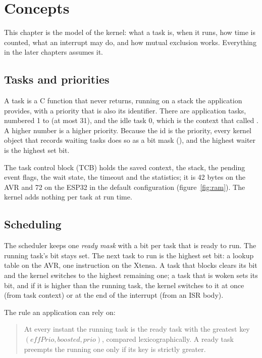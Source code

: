 \chapter{Concepts}
\label{ch:concepts}

This chapter is the model of the kernel: what a task is, when it runs, how time is
counted, what an interrupt may do, and how mutual exclusion works. Everything in the
later chapters assumes it.

\section{Tasks and priorities}

A task is a C function that never returns, running on a stack the application provides,
with a priority that is also its identifier. There are 
application tasks, numbered 1 to  (at most 31), and the idle
task 0, which is the context that called . A higher number is a higher
priority. Because the id is the priority, every kernel object that records waiting tasks
does so as a bit mask (), and the highest waiter is the highest
set bit.

The task control block (TCB) holds the saved context, the stack, the pending event flags,
the wait state, the timeout and the statistics; it is 42 bytes on the AVR and 72 on the
ESP32 in the default configuration (figure~\ref{fig:ram}). The kernel adds nothing per
task at run time.

\section{Scheduling}
\label{sec:sched}

The scheduler keeps one \emph{ready mask} with a bit per task that is ready to run. The
running task's bit stays set. The next task to run is the highest set bit: a lookup
table on the AVR, one instruction on the Xtensa. A task that blocks clears its bit and
the kernel switches to the highest remaining one; a task that is woken sets its bit, and
if it is higher than the running task, the kernel switches to it at once (from task
context) or at the end of the interrupt (from an ISR body).

The rule an application can rely on:

\begin{quote}
At every instant the running task is the ready task with the greatest key
$(\mathit{effPrio}, \mathit{boosted}, \mathit{prio})$, compared lexicographically. A
ready task preempts the running one only if its key is strictly greater.
\end{quote}

